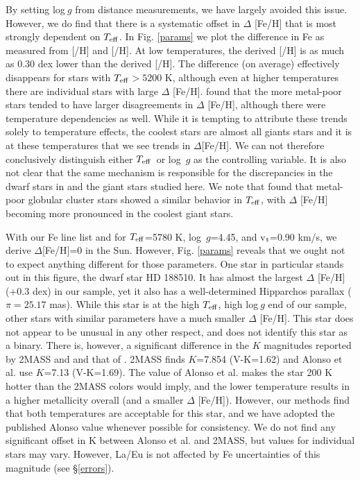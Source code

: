 \documentclass[12pt,preprint]{aastex}
\def\teff{\mbox{$T_{\rm {eff}}$}}
\def\vt{\mbox{v$_{\rm t}$}}
\begin{document}
By setting log$~g$ from distance measurements, we have largely avoided this issue.  However, we do find that there is a systematic offset in $\Delta$ [Fe/H] that is most strongly dependent on \teff.  In Fig. \ref{params} we plot the difference in Fe as measured from [/H] and [/H].  At low temperatures, the derived [/H] is as much as 0.30 dex lower than the derived [/H].  The difference (on average) effectively disappears for stars with \teff$>5200$ K, although even at higher temperatures there are individual stars with large $\Delta$ [Fe/H].  \citet{Thevenin1999} found that the more metal-poor stars tended to have larger disagreements in $\Delta$ [Fe/H], although there were temperature dependencies as well.  While it is tempting to attribute these trends solely to temperature effects, the coolest stars are almost all giants stars and it is at these temperatures that we see trends in $\Delta$[Fe/H].  We can not therefore conclusively distinguish either \teff~or log~$g$ as the controlling variable.  It is also not clear that the same mechanism is responsible for the discrepancies in the dwarf stars in \citet{Thevenin1999} and the giant stars studied here.   We note that \citet{Yong2003} found that metal-poor globular cluster stars showed a similar behavior in \teff, with $\Delta$ [Fe/H] becoming more pronounced in the coolest giant stars. 

With our Fe line list and for \teff=5780 K, log~$g$=4.45, and \vt=0.90 km/s, we derive $\Delta$[Fe/H]=0 in the Sun.  However, Fig. \ref{params} reveals that we ought not to expect anything different for those parameters.  One star in particular stands out in this figure, the dwarf star HD 188510.  It has almost the largest $\Delta$ [Fe/H] (+0.3 dex) in our sample, yet it also has a well-determined Hipparchos parallax ($\pi=25.17$ mas).  While this star is at the high \teff, high log$~g$ end of our sample, other stars with similar parameters have a much smaller $\Delta$ [Fe/H].  This star does not appear to be unusual in any other respect, and \citet{Latham2002} does not identify this star as a binary. There is, however, a significant difference in the $K$ magnitudes reported by 2MASS and and that of \citet{AlonsoDwarf}.  2MASS finds $K$=7.854 (V-K=1.62) and Alonso et al. use $K$=7.13 (V-K=1.69).  The value of Alonso et al. makes the star 200 K hotter than the 2MASS colors would imply, and the lower  temperature results in a higher metallicity overall (and a smaller $\Delta$ [Fe/H]).  However, our methods find that both temperatures are acceptable for this star, and we have adopted the published Alonso value whenever possible for consistency.  We do not find any significant offset in K between Alonso et al. and 2MASS, but values for individual stars may vary.  However, La/Eu is not affected by Fe uncertainties of this magnitude (see \S \ref{errors}).  
\end{document}
